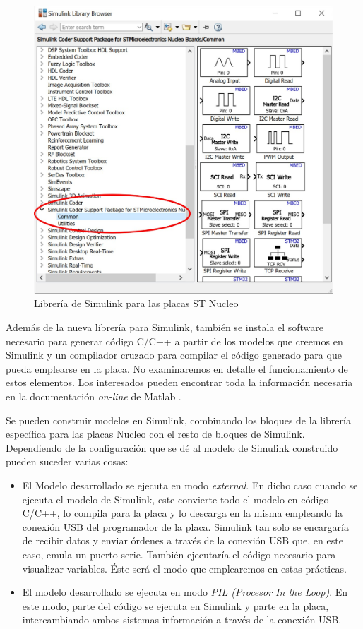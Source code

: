 \documentclass[10pt,a4paper]{report}
\begin{document}
\begin{figure}
\centering
\includegraphics[scale=0.5]{sbroser.jpg}
\caption{Librería de Simulink para las placas ST Nucleo}\label{f16}
\end{figure} 

Además de la nueva librería para Simulink, también se instala el software necesario para generar código C/C++ a partir de los modelos que creemos en Simulink  y un compilador cruzado para compilar el código generado para que pueda emplearse en la placa. No examinaremos en detalle el funcionamiento de estos elementos. Los interesados pueden encontrar toda la información necesaria en la documentación \emph{on-line} de Matlab \cite{slkhelp}.

Se pueden construir modelos en Simulink, combinando los bloques de la librería específica para las placas Nucleo con el resto de bloques de Simulink. Dependiendo de la configuración que se dé al modelo de Simulink construido pueden suceder varias cosas:
\begin{itemize}
\item El Modelo desarrollado se ejecuta en modo \emph{external}. En dicho caso cuando se ejecuta el modelo de Simulink, este convierte todo el modelo en código C/C++, lo compila para la placa y lo descarga en la misma empleando la conexión USB del programador de la placa. Simulink tan solo se encargaría de recibir datos y enviar órdenes a través de la conexión USB que, en este caso, emula un puerto serie. También ejecutaría el código necesario para visualizar variables.  Éste será el modo que emplearemos en estas prácticas.

\item El modelo desarrollado se ejecuta en modo \emph{PIL (Procesor In the Loop)}. En este modo, parte del código se ejecuta en Simulink y parte en la placa, intercambiando ambos sistemas información a través de la conexión USB. 
 
\end{itemize}
\end{document}
